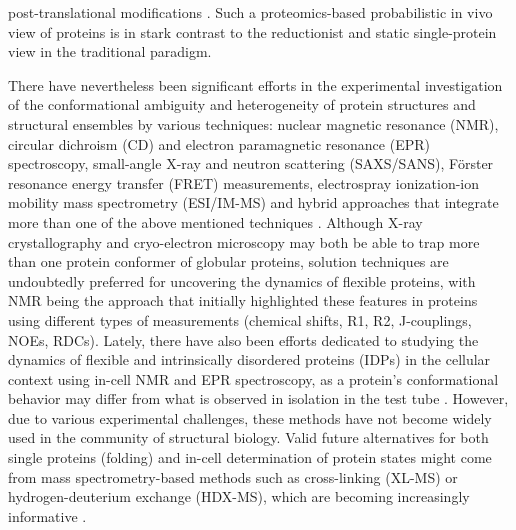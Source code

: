 post-translational modifications \cite{vu_protein_2018}. Such a proteomics-based probabilistic in vivo view of proteins is in stark contrast to the reductionist and static single-protein view in the traditional paradigm.

There have nevertheless been significant efforts in the experimental investigation of the conformational ambiguity and heterogeneity of protein structures and structural ensembles by various techniques: nuclear magnetic resonance (NMR), circular dichroism (CD) and electron paramagnetic resonance (EPR) spectroscopy, small-angle X-ray and neutron scattering (SAXS/SANS), Förster resonance energy transfer (FRET) measurements, electrospray ionization-ion mobility mass spectrometry (ESI/IM-MS) and hybrid approaches that integrate more than one of the above mentioned techniques \cite{dobson_biophysical_2019}. Although X-ray crystallography and cryo-electron microscopy may both be able to trap more than one protein conformer of globular proteins, solution techniques are undoubtedly preferred for uncovering the dynamics of flexible proteins, with NMR being the approach that initially highlighted these features in proteins using different types of measurements (chemical shifts, R1, R2, J-couplings, NOEs, RDCs). Lately, there have also been efforts dedicated to studying the dynamics of flexible and intrinsically disordered proteins (IDPs) in the cellular context using in-cell NMR and EPR spectroscopy, as a protein’s conformational behavior may differ from what is observed in isolation in the test tube \cite{kragelund_-cell_2020, bonucci_crowding_2021}. However, due to various experimental challenges, these methods have not become widely used in the community of structural biology. Valid future alternatives for both single proteins (folding) and in-cell determination of protein states might come from mass spectrometry-based methods such as cross-linking (XL-MS) or hydrogen-deuterium exchange (HDX-MS), which are becoming increasingly informative \cite{britt_integration_2022}.

